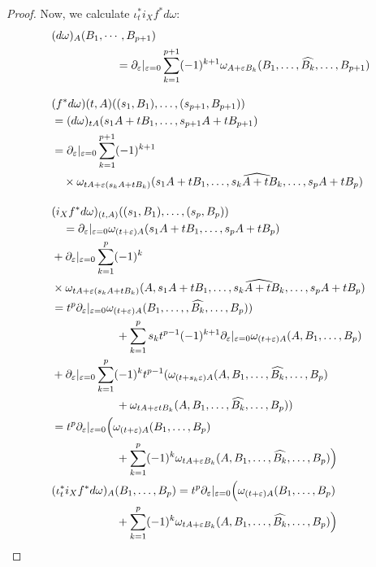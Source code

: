 \documentclass[b5paper,draft,openbib,12pt]{memoir}
\begin{document}
\begin{proof}
  
  Now, we calculate \(\iota^*_t i_X f^* d \omega\):
  \begin{align}\notag
  &(d\omega)_A(B_1,\cdots, B_{p+1})\\
  &\hspace{2cm}=\partial_\varepsilon |_{\varepsilon=0} \sum_{k=1}^{p+1} (-1)^{k+1} \omega_{A+\varepsilon B_k}(B_1,\dots , \widehat{B_k}, \dots, B_{p+1})\\[0.3cm]
  &(f^* d \omega){(t,A)}((s_1,B_1),\dots , (s_{p+1},B_{p+1}))\\\notag
  &= (d\omega)_{tA}(s_1A + t B_1, \dots, s_{p+1}A+t B_{p+1})\\
  &=\partial_{\varepsilon}|_{\varepsilon =0} \sum_{k=1}^{p+1}(-1)^{k+1}\\\notag
  &\quad \times\omega_{tA + \varepsilon(s_kA + t B_k)}(s_1A+tB_1, \dots,  \widehat{s_k A + t B_k},\dots , s_p A  + t B_p )\\[0.4cm]
  &(i_X f^* d \omega)_{(t,A)}((s_1,B_1),\dots , (s_p, B_p))\\\notag
  &\quad= \partial_{\varepsilon} |_{\varepsilon =0} \omega_{(t+\varepsilon)A}(s_1A+tB_1, \dots, s_pA+t B_p)\\\notag
  &+\partial_{\varepsilon}|_{\varepsilon=0} \sum_{k=1}^p (-1)^k\\\notag
  &\times\omega_{tA + \varepsilon(s_k A + t B_k)} (A,s_1A+t B_1, \dots, \widehat{s_k A + t B_k},\dots, s_p A + t B_p)\\
  &= t^p \partial_{\varepsilon}|_{\varepsilon=0}\omega_{(t+\varepsilon)A }(B_1,\dots, ,\widehat{B_k},\dots, B_p))\\
  &\hspace{2cm}+ \sum_{k=1}^p s_k t^{p-1} (-1)^{k+1} \partial_{\varepsilon}|_{\varepsilon=0}\omega_{(t+\varepsilon)A}(A,B_1,\dots, B_p) \\
  &+\partial_{\varepsilon}|_{\varepsilon=0}\sum_{k=1}^p(-1)^k t^{p-1}(\omega_{(t+s_k\varepsilon)A}(A,B_1,\dots, \widehat{B_k},\dots, B_p) \\
  &\hspace{2cm} + \omega_{tA + \varepsilon t B_k}(A,B_1, \dots, \widehat{B_k},\dots, B_p))\\
  &=t^p\partial_{\varepsilon}|_{\varepsilon=0} \Big(\omega_{(t+\varepsilon)A}(B_1,\dots, B_p)\\\notag
  &\hspace{2cm} +\sum_{k=1}^p (-1)^k \omega_{tA+\varepsilon B_k}(A,B_1,\dots, \widehat{B_k},\dots, B_p)\Big)\\\label{li derivative 2}
  &(\iota_t^* i_X f^* d \omega)_{A}(B_1,\dots ,  B_p)=t^p\partial_{\varepsilon}|_{\varepsilon=0} \Big(\omega_{(t+\varepsilon)A}(B_1,\dots, B_p)\\\notag
  &\hspace{2cm}+\sum_{k=1}^p (-1)^k \omega_{tA+\varepsilon B_k}(A,B_1,\dots, \widehat{B_k},\dots, B_p)\Big)
  \end{align}
  

\end{proof}
\end{document}
